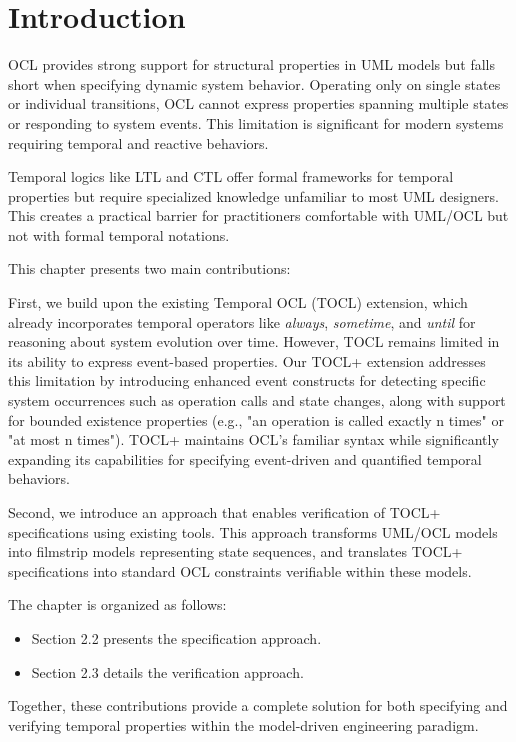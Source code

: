 \section{Introduction}

\hspace{1cm} OCL provides strong support for structural properties in UML models but 
falls short when specifying dynamic system behavior. Operating only on single states 
or individual transitions, OCL cannot express properties spanning multiple states or 
responding to system events. This limitation is significant for modern systems 
requiring temporal and reactive behaviors.

Temporal logics like LTL and CTL offer formal frameworks for temporal properties but 
require specialized knowledge unfamiliar to most UML designers. This creates a practical 
barrier for practitioners comfortable with UML/OCL but not with formal temporal notations.

This chapter presents two main contributions:

First, we build upon the existing Temporal OCL (TOCL) extension, which already 
incorporates temporal operators like \textit{always}, \textit{sometime}, and 
\textit{until} for reasoning about system evolution over time. However, TOCL remains 
limited in its ability to express event-based properties. Our TOCL+ extension 
addresses this limitation by introducing enhanced event constructs for detecting 
specific system occurrences such as operation calls and state changes, along with 
support for bounded existence properties (e.g., "an operation is called exactly n 
times" or "at most n times"). TOCL+ maintains OCL's familiar syntax while 
significantly expanding its capabilities for specifying event-driven and quantified 
temporal behaviors.

Second, we introduce an approach that enables verification of TOCL+ 
specifications using existing tools. This approach transforms UML/OCL models into 
filmstrip models representing state sequences, and translates TOCL+ specifications 
into standard OCL constraints verifiable within these models.

The chapter is organized as follows:
\begin{itemize}
    \item Section 2.2 presents the specification approach.
    
    \item Section 2.3 details the verification approach.
\end{itemize}

Together, these contributions provide a complete solution for both specifying and 
verifying temporal properties within the model-driven engineering paradigm.